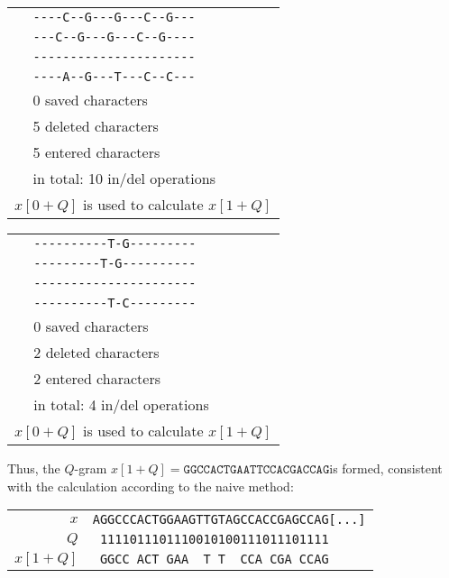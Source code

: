 \begin{example}
	\begin{center}
		\begin{tabular}{c | l}
			\multirow{8}{*}{\rotatebox[origin=c]{90}{$\texttt{one\_to\_keep}_1$}}
			& \verb|----C--G---G---C--G---| \\
			& \verb|---C--G---G---C--G----| \\
			& \verb|----------------------| \\
			& \verb|----A--G---T---C--C---| \\
			\cmidrule{2-2}
			& 0 saved characters \\
			& 5 deleted characters \\
			& 5 entered characters \\
			\cmidrule{2-2}
			& in total: 10 in/del operations \\
			\bottomrule
			\multicolumn{2}{c}{$x[0 + Q]$ is used to calculate $x[1 + Q]$} \\
		\end{tabular}
	\end{center}
	
	\begin{center}
		\begin{tabular}{c | l}
			\multirow{8}{*}{\rotatebox[origin=c]{90}{$\texttt{one\_to\_keep}_2$}}
			& \verb|----------T-G---------| \\
			& \verb|---------T-G----------| \\
			& \verb|----------------------| \\
			& \verb|----------T-C---------| \\
			\cmidrule{2-2}
			& 0 saved characters \\
			& 2 deleted characters \\
			& 2 entered characters \\
			\cmidrule{2-2}
			& in total: 4 in/del operations \\
			\bottomrule
			\multicolumn{2}{c}{$x[0 + Q]$ is used to calculate $x[1 + Q]$} \\
		\end{tabular}
	\end{center}
	
	Thus, the $Q$-gram $x[1 + Q] = \texttt{GGCCACTGAATTCCACGACCAG}$is formed, consistent with the calculation according to the naive method:
	\begin{center}
		\begin{tabular}{r || l}
			$x$ & \texttt{AGGCCCACTGGAAGTTGTAGCCACCGAGCCAG[...]} \\
			$Q$ & \texttt{\ 1111011101110010100111011101111} \\
			$x[1 + Q]$ & \texttt{\ GGCC\ ACT\ GAA\ \ T\ T\ \ CCA\ CGA\ CCAG} \\
		\end{tabular}
	\end{center}
\end{example}

